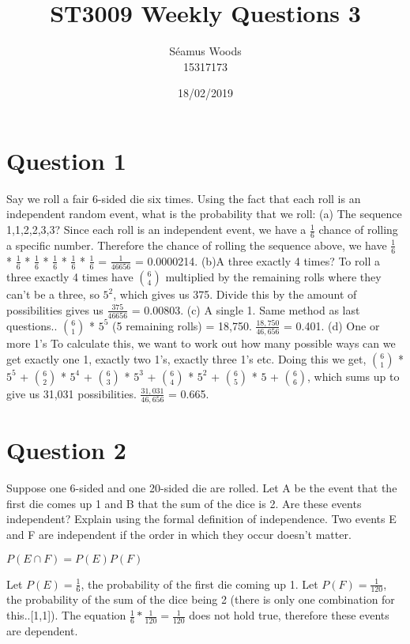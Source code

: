 \documentclass[12pt]{report}
\title{ST3009 Weekly Questions 3}
\author{Séamus Woods \\ 15317173}
\date{18/02/2019}
\begin{document}
\maketitle
\newpage

\section{Question 1}
Say we roll a fair 6-sided die six times. Using the fact that each roll is an independent random event, what is the probability that we roll:
\newline
\newline
(a) The sequence 1,1,2,2,3,3?
\newline
Since each roll is an independent event, we have a $\frac{1}{6}$ chance of rolling a specific number. Therefore the chance of rolling the sequence above, we have $\frac{1}{6}$ * $\frac{1}{6}$ * $\frac{1}{6}$ * $\frac{1}{6}$ * $\frac{1}{6}$ * $\frac{1}{6}$ = $\frac{1}{46656}$ = 0.0000214.
\newline
\newline
(b)A three exactly 4 times?
\newline
To roll a three exactly 4 times have $6 \choose 4$ multiplied by the remaining rolls where they can't be a three, so $5^2$, which gives us 375. Divide this by the amount of possibilities gives us $\frac{375}{46656}$ = 0.00803.
\newline
\newline
(c) A single 1.
\newline
Same method as last questions.. $6 \choose 1$ * $5^5$ (5 remaining rolls) = 18,750. $\frac{18,750}{46,656}$ = 0.401.
\newline
\newline
(d) One or more 1's
\newline
To calculate this, we want to work out how many possible ways can we get exactly one 1, exactly two 1's, exactly three 1's etc. Doing this we get, $6 \choose 1$ * $5^5$ + $6 \choose 2$ * $5^4$ + $6 \choose 3$ * $5^3$ + $6 \choose 4$ * $5^2$ + $6 \choose 5$ * $5$ + $6 \choose 6$, which sums up to give us 31,031 possibilities. $\frac{31,031}{46,656}$ = 0.665.


\section{Question 2}
Suppose one 6-sided and one 20-sided die are rolled. Let A be the event that the first die comes up 1 and B that the sum of the dice is 2. Are these events independent? Explain using the formal definition of independence.
\newline
\newline
Two events E and F are independent if the order in which they occur doesn't matter.
\begin{center}
$P(E \cap F) = P(E)P(F)$
\end{center}
Let $P(E) = \frac{1}{6}$, the probability of the first die coming up 1. Let $P(F) = \frac{1}{120}$, the probability of the sum of the dice being 2 (there is only one combination for this..[1,1]). The equation $\frac{1}{6} * \frac{1}{120} = \frac{1}{120}$ does not hold true, therefore these events are dependent.
\end{document}
